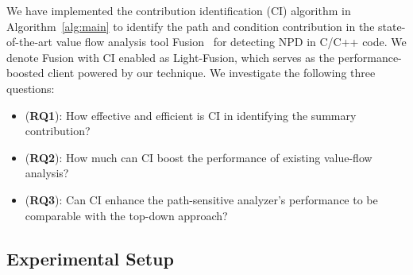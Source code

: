We have implemented the contribution identification (CI) algorithm in Algorithm~\ref{alg:main} to identify the path and condition contribution in the state-of-the-art value flow analysis tool Fusion~\cite{shi2021path} for detecting NPD in C/C++ code.
We denote Fusion with CI enabled as Light-Fusion, which serves as the performance-boosted client powered by our technique.
We investigate the following three questions:
\begin{itemize}
    \item (\textbf{RQ1}): How effective and efficient is CI in identifying the summary contribution?
    \item (\textbf{RQ2}): How much can CI boost the performance of existing value-flow analysis?
    \item (\textbf{RQ3}): Can CI enhance the path-sensitive analyzer's performance to be comparable with the top-down approach?
\end{itemize}




\subsection{Experimental Setup}






